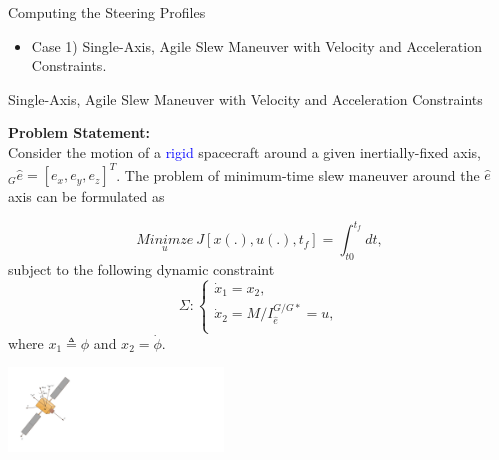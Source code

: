 \documentclass{beamer}
\begin{document}
\begin{frame}
\begin{block}{}
\begin{center}
{\LARGE{Computing the Steering Profiles}}
\begin{itemize}
\item Case 1)  Single-Axis, Agile Slew Maneuver with Velocity and Acceleration Constraints.
\end{itemize}
\end{center}
\end{block}
\end{frame}
\begin{frame}
\begin{block}{ Single-Axis, Agile Slew Maneuver with Velocity and Acceleration Constraints}

 {\bf Problem Statement:} \\ Consider the motion of a \textcolor{blue}{rigid} spacecraft around a given inertially-fixed axis, $_G\hat{e}=[e_x,e_y,e_z]^T$. The problem of minimum-time slew maneuver around the $\hat{e}$ axis can be formulated as

\begin{minipage}{0.55\textwidth}
\begin{equation}\label{costfunction}
\underset{u}{Minimze}\ J[x(.), u(.), t_f]=\int_{t0}^{t_f} dt,
\end{equation}
subject to the following dynamic constraint
\begin{equation}\label{system}
 \Sigma:\left\{
                \begin{array}{l}
                \dot{x}_1=x_2, \\
                \dot{x}_2=M/I_{\hat{e}}^{G/G*}=u, \\
                \end{array}
              \right.
 \end{equation}
where $x_1\triangleq\phi$ and $x_2=\dot{\phi}$. 
\end{minipage}
\begin{minipage}{0.35\textwidth}
\begin{center}
\includegraphics[width=2.25in]{./Figures/Spacecraft}      
\end{center}
\end{minipage}
\end{block}
\end{frame}
\end{document}
